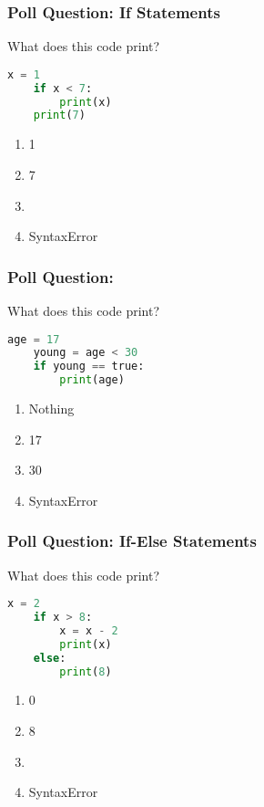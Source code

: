 \documentclass{beamer}
\begin{document}
%
%
\begin{frame}[fragile]
	\frametitle{Poll Question: If Statements}
	What does this code print?
	\begin{lstlisting}[language=Python, autogobble]
	x = 1
	if x < 7:
		print(x) 
	print(7)
	\end{lstlisting}
	\vfill
	\begin{enumerate}[A]
		\item 1
		\item 7
		\item {}
		\item SyntaxError
	\end{enumerate}
\end{frame}

%
%
\begin{frame}[fragile]
	\frametitle{Poll Question: }
	What does this code print?
	\begin{lstlisting}[language=Python, autogobble]
	age = 17
	young = age < 30
	if young == true:
		print(age)
	\end{lstlisting}
	\vfill
	\begin{enumerate}[A]
		\item Nothing
		\item 17
		\item 30
		\item SyntaxError
	\end{enumerate}
\end{frame}

%
%
\begin{frame}[fragile]
	\frametitle{Poll Question: If-Else Statements}
	What does this code print?
	\begin{lstlisting}[language=Python, autogobble]
	x = 2
	if x > 8:
		x = x - 2
		print(x)
	else:
		print(8)
	\end{lstlisting}
	\vfill
	\begin{enumerate}[A]
		\item 0
		\item 8
		\item {}
		\item SyntaxError
	\end{enumerate}
\end{frame}

%
%
\end{document}
